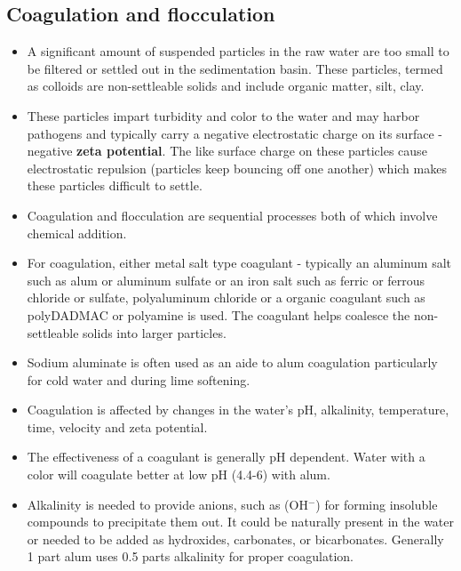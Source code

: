 \begin{itemize}
\begin{itemize}


\end{itemize}

\subsection{Coagulation and flocculation}
\begin{itemize}
\item A significant amount of suspended particles in the raw water are too small to be filtered or settled out in the sedimentation basin.  These particles, termed as colloids are non-settleable solids and include organic matter, silt, clay.
\item These particles impart turbidity and color to the water and may harbor pathogens and typically carry a negative electrostatic charge on its surface - negative \textbf{zeta potential}.  The like surface charge on these particles cause electrostatic repulsion (particles keep bouncing off one another) which makes these particles difficult to settle. 
\item Coagulation and flocculation are sequential processes both of which involve chemical addition.
\item For coagulation, either metal salt type coagulant - typically an aluminum salt such as alum or aluminum sulfate or an iron salt such as ferric or ferrous chloride or sulfate, polyaluminum chloride or a organic coagulant such as polyDADMAC or polyamine is used. The coagulant helps coalesce the non-settleable solids into larger particles.
\item Sodium aluminate is often used as an aide to alum coagulation particularly for cold water and during lime softening.
\item Coagulation is affected by changes in the water's pH, alkalinity, temperature, time, velocity and zeta potential.

\item The effectiveness of a coagulant is generally pH dependent. Water with a color will coagulate better at low pH (4.4-6) with alum.

\item Alkalinity is needed to provide anions, such as (OH$^-$) for forming insoluble compounds to precipitate them out. It could be naturally present in the water or needed to be added as hydroxides, carbonates, or bicarbonates.  Generally 1 part alum uses 0.5 parts alkalinity for proper coagulation.


\end{itemize}
\end{itemize}
